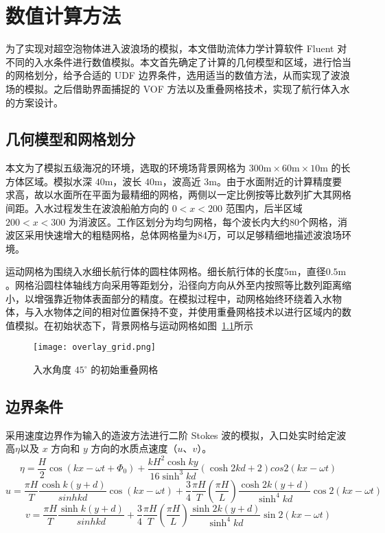 \chapter{数值计算方法}
为了实现对超空泡物体进入波浪场的模拟，本文借助流体力学计算软件 Fluent 对不同的入水条件进行数值模拟。本文首先确定了计算的几何模型和区域，进行恰当的网格划分，给予合适的 UDF 边界条件，选用适当的数值方法，从而实现了波浪场的模拟。之后借助界面捕捉的 VOF 方法以及重叠网格技术，实现了航行体入水的方案设计。
\section{几何模型和网格划分}
本文为了模拟五级海况\cite{Xia1987}的环境，选取的环境场背景网格为 $300 \mathrm m \times 60 \mathrm m \times 10 \mathrm m$ 的长方体区域。模拟水深 $40 \mathrm m$，波长 $40 \mathrm m$，波高近 $3 \mathrm m$。由于水面附近的计算精度要求高，故以水面所在平面为最精细的网格，两侧以一定比例按等比数列扩大其网格间距。入水过程发生在波浪船舶方向的 $0 < x < 200$ 范围内，后半区域 $200 < x < 300$ 为消波区。工作区划分为均匀网格，每个波长内大约80个网格，消波区采用快速增大的粗糙网格，总体网格量为84万，可以足够精细地描述波浪场环境。

运动网格为围绕入水细长航行体的圆柱体网格。细长航行体的长度$5 \mathrm m$，直径$0.5 \mathrm m$。网格沿圆柱体轴线方向采用等距划分，沿径向方向从外至内按照等比数列距离缩小，以增强靠近物体表面部分的精度。在模拟过程中，动网格始终环绕着入水物体，与入水物体之间的相对位置保持不变，并使用重叠网格技术以进行区域内的数值模拟。在初始状态下，背景网格与运动网格如图~\ref{fig:overlay_grid}所示

\begin{figure}[!htp]
  \centering
  \texttt{[image: overlay\_grid.png]}
  \caption[]{入水角度 $45 ^ \circ$ 的初始重叠网格}
  \label{fig:overlay_grid}
\end{figure}

\section{边界条件}
采用速度边界作为输入的造波方法进行二阶 Stokes 波的模拟，入口处实时给定波高$\eta$以及 $x$ 方向和 $y$ 方向的水质点速度（$u$、$v$）\cite{Zou2005}。
\begin{equation}
  \eta = \frac H 2 \cos (kx - \omega t + \Phi _0) + \frac {k H^2 \cosh k y} {16 \sinh ^3 kd} (\cosh 2kd + 2)cos2(kx - \omega t)
\end{equation}
\begin{equation}
  u = \frac {\pi H} T \frac {\cosh k(y + d)} {sinh kd} \cos (kx - \omega t) + \frac 3 4 \frac {\pi H} T \left( \frac {\pi H} L \right) \frac {\cosh 2k(y + d)} {\sinh^4 kd} \cos 2(kx - \omega t)
\end{equation}
\begin{equation}
  v = \frac {\pi H} T \frac {\sinh k(y + d)} {sinh kd} + \frac 3 4 \frac {\pi H} T \left( \frac {\pi H} L \right) \frac {\sinh 2k(y + d)} {\sinh^4 kd} \sin 2(kx - \omega t)
\end{equation}

